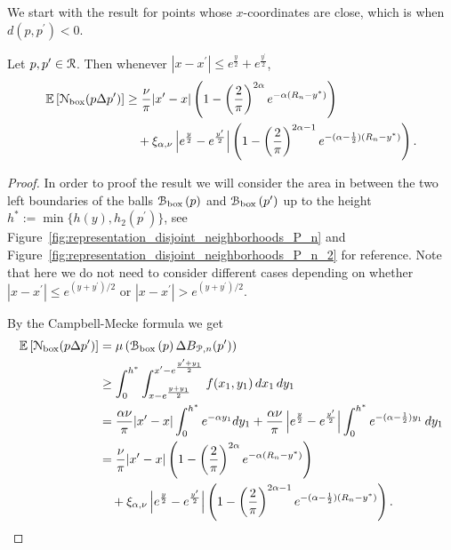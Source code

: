 We start with the result for points whose $x$-coordinates are close, which is when $d(p,p^\prime) < 0$.

\begin{lemma}\label{lem:disjoint_neighbors_P_n}
Let $p, p ^\prime \in {\mathcal R}$. Then whenever $|x - x^\prime| \le e^{\frac{y}{2}} + e^{\frac{y^\prime}{2}}$,
\begin{align*}
	\mathbb{E}\left[{\mathcal N}_{\text{box}}(p \Delta p^\prime)\right]
	&\ge \frac{\nu}{\pi}|x^\prime - x|\left(1 - \left(\frac{2}{\pi}\right)^{2\alpha}e^{-\alpha(R_n - y^\ast)}\right)\\
	&\hspace{10pt}+ \xi_{\alpha, \nu}\left|e^{\frac{y}{2}} - e^{\frac{y^\prime}{2}}\right|
		\left(1 - \left(\frac{2}{\pi}\right)^{2\alpha - 1}e^{-(\alpha - \frac{1}{2})(R_n-y^\ast)}\right).
\end{align*}
\end{lemma}

\begin{proof}
In order to proof the result we will consider the area in between the two left boundaries of the balls ${\mathcal B}_{\text{box}}\left(p\right)$ and
${\mathcal B}_{\text{box}}\left(p^\prime\right)$ up to the height $h^\ast := \min\{h(y), h_2(p^\prime)\}$, see Figure~\ref{fig:representation_disjoint_neighborhoods_P_n} and Figure~\ref{fig:representation_disjoint_neighborhoods_P_n_2} for reference. Note that here we do not need to consider different cases depending on whether $|x - x^\prime| \le e^{(y + y^\prime)/2}$ or $|x - x^\prime| > e^{(y + y^\prime)/2}$. 

By the Campbell-Mecke formula we get
\begin{align*}
	\mathbb{E}\left[{\mathcal N}_{\text{box}}(p \Delta p^\prime)\right] &=	\mu\left({\mathcal B}_{\text{box}}\left(p\right) \Delta B_{{\mathcal P},n}(p^\prime)\right)\\
	&\ge \int_0^{h^\ast} \int_{x - e^{\frac{y + y_1}{2}}}^{x^\prime - e^{\frac{y^\prime + y_1}{2}}} f(x_1,y_1)
		\, dx_1 \, dy_1 \\
	&= \frac{\alpha \nu}{\pi}|x^\prime - x| \int_{0}^{h^\ast} e^{-\alpha y_1} dy_1
		+ \frac{\alpha \nu}{\pi}\left|e^{\frac{y}{2}} - e^{\frac{y^\prime}{2}}\right| \int_0^{h^\ast} 
		e^{-(\alpha-\frac{1}{2})y_1} \, dy_1\\
	&= \frac{\nu}{\pi}|x^\prime - x|\left(1 - \left(\frac{2}{\pi}\right)^{2\alpha}e^{-\alpha(R_n - y^\ast)}\right)\\
	&\hspace{10pt}+ \xi_{\alpha, \nu}\left|e^{\frac{y}{2}} - e^{\frac{y^\prime}{2}}\right|
		\left(1 - \left(\frac{2}{\pi}\right)^{2\alpha - 1}e^{-(\alpha - \frac{1}{2})(R_n-y^\ast)}\right).
\end{align*}
\end{proof}

